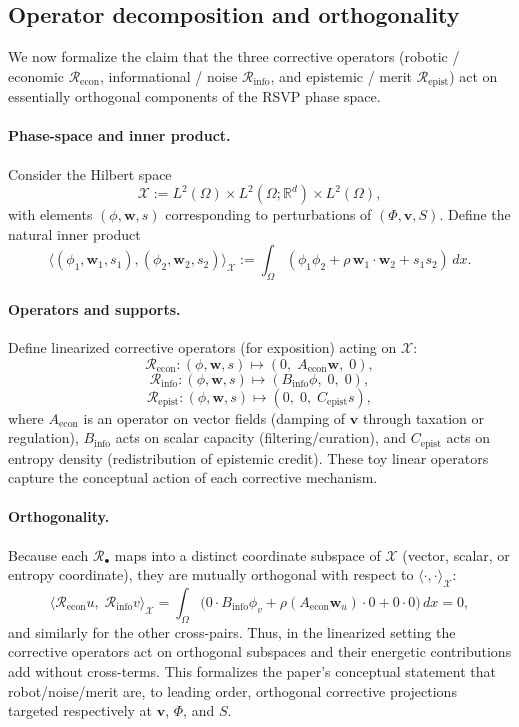 \documentclass[12pt]{article}
\begin{document}
\subsection{Operator decomposition and orthogonality}
We now formalize the claim that the three corrective operators (robotic / economic $\mathcal R_{\mathrm{econ}}$, informational / noise $\mathcal R_{\mathrm{info}}$, and epistemic / merit $\mathcal R_{\mathrm{epist}}$) act on essentially orthogonal components of the RSVP phase space.

\paragraph{Phase-space and inner product.}  
Consider the Hilbert space
\[
\mathcal X := L^2(\Omega)\times L^2(\Omega;\mathbb R^d)\times L^2(\Omega),
\]
with elements $(\phi,\mathbf w,s)$ corresponding to perturbations of $(\Phi,\mathbf v,S)$. Define the natural inner product
\[
\big\langle (\phi_1,\mathbf w_1,s_1),(\phi_2,\mathbf w_2,s_2)\big\rangle_{\mathcal X}
:= \int_{\Omega}\left(\phi_1\phi_2 + \rho\,\mathbf w_1\cdot\mathbf w_2 + s_1 s_2\right)\,dx.
\]

\paragraph{Operators and supports.}  
Define linearized corrective operators (for exposition) acting on $\mathcal X$:
\[
\mathcal R_{\mathrm{econ}}:(\phi,\mathbf w,s)\mapsto(0,\;A_{\mathrm{econ}}\mathbf w,\;0),
\]
\[
\mathcal R_{\mathrm{info}}:(\phi,\mathbf w,s)\mapsto(B_{\mathrm{info}}\phi,\;0,\;0),
\]
\[
\mathcal R_{\mathrm{epist}}:(\phi,\mathbf w,s)\mapsto(0,\;0,\;C_{\mathrm{epist}}s),
\]
where $A_{\mathrm{econ}}$ is an operator on vector fields (damping of $\mathbf v$ through taxation or regulation), $B_{\mathrm{info}}$ acts on scalar capacity (filtering/curation), and $C_{\mathrm{epist}}$ acts on entropy density (redistribution of epistemic credit). These toy linear operators capture the conceptual action of each corrective mechanism.

\paragraph{Orthogonality.}  
Because each $\mathcal R_\bullet$ maps into a distinct coordinate subspace of $\mathcal X$ (vector, scalar, or entropy coordinate), they are mutually orthogonal with respect to $\langle\cdot,\cdot\rangle_{\mathcal X}$:
\[
\big\langle \mathcal R_{\mathrm{econ}} u,\; \mathcal R_{\mathrm{info}} v\big\rangle_{\mathcal X}
= \int_{\Omega}\big(0\cdot B_{\mathrm{info}}\phi_v + \rho(A_{\mathrm{econ}}\mathbf w_u)\cdot 0 + 0\cdot 0\big)\,dx = 0,
\]
and similarly for the other cross-pairs. Thus, in the linearized setting the corrective operators act on orthogonal subspaces and their energetic contributions add without cross-terms. This formalizes the paper’s conceptual statement that robot/noise/merit are, to leading order, orthogonal corrective projections targeted respectively at $\mathbf v$, $\Phi$, and $S$.
\end{document}
